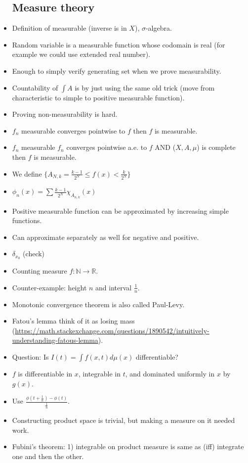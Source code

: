 \documentclass{article}
\theoremstyle{remark}
\begin{document}
\begin{itemize}
\subsection*{Measure theory}
\item Definition of measurable (inverse is in $X$), $\sigma$-algebra. 
\item Random variable is a measurable function whose codomain is real (for example we could use extended real number).
\item Enough to simply verify generating set when we prove measurability.
\item Countability of $\int A$ is by just using the same old trick (move from characteristic to simple to positive measurable function).
\item Proving non-measurability is hard. 
\item $f_n$ measurable converges pointwise to $f$ then $f$ is measurable.
\item $f_n$ measurable $f_n$ converges pointwise a.e. to $f$ AND ($X, A, \mu$) is complete then $f$ is measurable.
\item We define $\{A_{N,k}=\frac{k-1}{2^N}\leq f(x)<\frac k{2^N}\}$
\item $\phi_n(x)=\sum\frac{k-1}{2^N}\chi_{A_{n,k}} (x)$
\item Positive measurable function can be approximated by increasing simple functions.
\item Can approximate separately as well for negative and positive.
\item $\delta_{x_0}$ (check)
\item Counting measure $f:\mathbb{N}\to\mathbb{R}$.
\item Counter-example: height $n$ and interval $\frac 1n$.
\item Monotonic convergence theorem is also called Paul-Levy.
\item Fatou's lemma think of it as losing mass (\url{https://math.stackexchange.com/questions/1890542/intuitively-understanding-fatous-lemma}).
\item Question: Is $I(t)=\int f(x,t)d\mu (x)$ differentiable?
\item $f$ is differentiable in $x$, integrable in $t$, and dominated uniformly in $x$ by $g(x)$.
\item Use $\frac{\phi(t+\frac 1n)-\phi(t)}{\frac 1n}$.
\item Constructing product space is trivial, but making a measure on it needed work.
\item Fubini's theorem: 1) integrable on product measure is same as (iff) integrate one and then the other.


\end{itemize}
\end{document}
